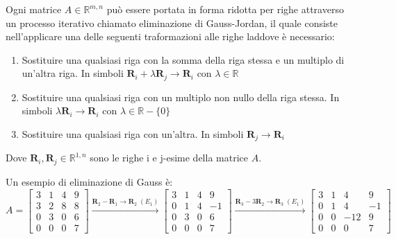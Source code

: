 \documentclass{article}
\begin{document}
    \vspace{10pt}
    Ogni matrice $A \in \mathbb{R}^{m, n}$ può essere portata in forma ridotta per righe attraverso un processo iterativo chiamato
    eliminazione di Gauss-Jordan, il quale consiste nell'applicare una delle seguenti traformazioni alle righe laddove è necessario:
    \begin{enumerate}[label=(E\textsubscript{\arabic*}), leftmargin=1cm]
        \item Sostituire una qualsiasi riga con la somma della riga stessa e un multiplo di un'altra riga. In simboli $\mathbf{R}_{i} + \lambda \mathbf{R}_{j} \rightarrow \mathbf{R}_{i}$ con $\lambda \in \mathbb{R}$ 
        \item Sostituire una qualsiasi riga con un multiplo non nullo della riga stessa. In simboli $\lambda \mathbf{R}_{i} \rightarrow \mathbf{R}_{i}$ con $\lambda \in \mathbb{R} - \{0\}$ 
        \item Sostituire una qualsiasi riga con un'altra. In simboli $\mathbf{R}_{j} \rightarrow \mathbf{R}_{i}$ 
    \end{enumerate}
    Dove $\mathbf{R}_{i}, \mathbf{R}_{j} \in \mathbb{R}^{1, n}$ sono le righe i e j-esime della matrice $A$.

    \vspace{10pt}
    Un esempio di eliminazione di Gauss è:
    \[
        A = 
        \begin{bmatrix}
            3 & 1 & 4 & 9 \\
            3 & 2 & 8 & 8 \\
            0 & 3 & 0 & 6 \\
            0 & 0 & 0 & 7 
        \end{bmatrix} 
        \xrightarrow{\mathbf{R}_{2} - \mathbf{R}_{1} \rightarrow \mathbf{R}_{2} \; (E_1)}
        \begin{bmatrix}
            3 & 1 & 4 & 9 \\
            0 & 1 & 4 & -1 \\
            0 & 3 & 0 & 6 \\
            0 & 0 & 0 & 7 
        \end{bmatrix} 
        \xrightarrow{\mathbf{R}_{3} - 3 \mathbf{R}_{2} \rightarrow \mathbf{R}_{3} \; (E_1)}
        \begin{bmatrix}
            3 & 1 & 4 & 9 \\
            0 & 1 & 4 & -1 \\
            0 & 0 & -12 & 9 \\
            0 & 0 & 0 & 7 
        \end{bmatrix} 
    \]
    
\end{document}
